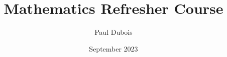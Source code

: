\documentclass[a4paper,12pt]{article}
\begin{document}
	
	\author{Paul Dubois}
	\title{Mathematics Refresher Course}
	\date{September 2023}
	
	\maketitle
	\tableofcontents
	

	

	
	
\end{document}
